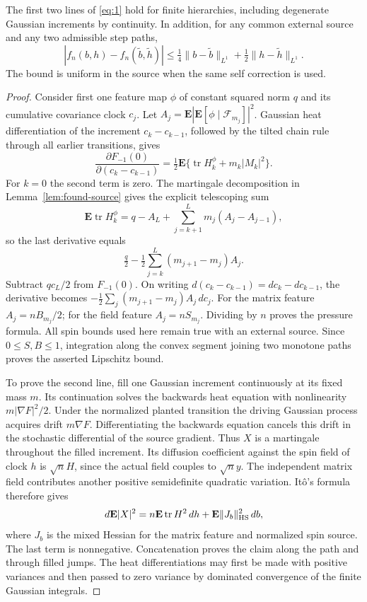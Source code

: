 \begin{lemma}\label{lem:found-pressure}
The first two lines of \eqref{eq:1} hold for finite hierarchies, including
degenerate Gaussian increments by continuity. In addition, for any common
external source and any two admissible step paths,
\[
 |f_n(b,h)-f_n(\widetilde b,\widetilde h)|
 \leq\tfrac14\|b-\widetilde b\|_{L^1}
        +\tfrac12\|h-\widetilde h\|_{L^1}.
\]
The bound is uniform in the source when the same self correction is used.
\end{lemma}

\begin{proof}
Consider first one feature map $\phi$ of constant squared norm $q$ and
its cumulative covariance clock $c_j$. Let
$A_j=\mathbf E|\mathbf E[\phi\mid\mathcal F_{m_j}]|^2$.
Gaussian heat differentiation of the increment $c_k-c_{k-1}$, followed by
the tilted chain rule through all earlier transitions, gives
\[
 \frac{\partial F_{-1}(0)}{\partial(c_k-c_{k-1})}
    =\tfrac12\mathbf E\{\operatorname{tr}H_k^\phi
                         +m_k|M_k|^2\}.
\]
For $k=0$ the second term is zero. The martingale decomposition in
Lemma~\ref{lem:found-source} gives the explicit telescoping sum
\[
 \mathbf E\operatorname{tr}H_k^\phi
     =q-A_L+\sum_{j=k+1}^L m_j(A_j-A_{j-1}),
\]
so the last derivative equals
\[
 \tfrac q2-\tfrac12\sum_{j=k}^L(m_{j+1}-m_j)A_j.
\]
Subtract $qc_L/2$ from $F_{-1}(0)$. On writing
$d(c_k-c_{k-1})=dc_k-dc_{k-1}$, the derivative becomes
$-\frac12\sum_j(m_{j+1}-m_j)A_j\,dc_j$.
For the matrix feature $A_j=nB_{m_j}/2$; for the field feature
$A_j=nS_{m_j}$. Dividing by $n$ proves the pressure formula. All spin
bounds used here remain true with an external source. Since $0\leq S,B\leq1$,
integration along the convex segment joining two monotone paths proves
the asserted Lipschitz bound.

To prove the second line, fill one Gaussian increment continuously at its
fixed mass $m$. Its continuation solves the backwards heat equation with
nonlinearity $m|\nabla F|^2/2$. Under the normalized planted transition the
driving Gaussian process acquires drift $m\nabla F$. Differentiating the
backwards equation cancels this drift in the stochastic differential of
the source gradient. Thus $X$ is a martingale throughout the filled
increment. Its diffusion coefficient against the spin field of clock
$h$ is $\sqrt n H$, since the actual field couples to $\sqrt n y$.
The independent matrix field contributes another positive semidefinite
quadratic variation. It\^o's formula therefore gives
\[
 d\mathbf E|X|^2
    =n\mathbf E\operatorname{tr}H^2\,dh
       +\mathbf E\|J_b\|_{\rm HS}^2\,db,
\]
where $J_b$ is the mixed Hessian for the matrix feature and normalized
spin source. The last term is nonnegative. Concatenation proves the
claim along the path and through filled jumps. The heat differentiations
may first be made with positive variances and then passed to zero
variance by dominated convergence of the finite Gaussian integrals.
\end{proof}

